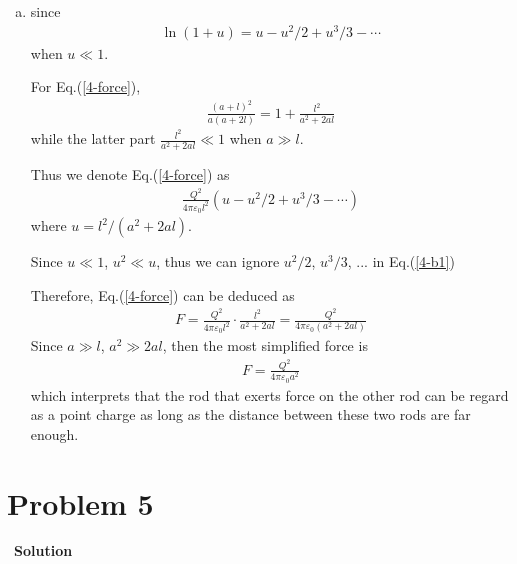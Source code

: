 \documentclass[12pt,a4paper]{article}
\begin{document}
\begin{enumerate}[(a)]
    \item since
    \begin{align}
        \ln (1+u) = u - u^2/2 + u^3/3 - \cdots
    \end{align}
    when $u \ll 1$.
    
    For Eq.(\ref{4-force}),
    \begin{align*}
        \frac{(a+l)^2}{a(a+2l)} = 1 + \frac{l^2}{a^2+2al}
    \end{align*}
    while the latter part $\frac{l^2}{a^2+2al} \ll 1$ when $a \gg l$.
    
    Thus we denote Eq.(\ref{4-force}) as
    \begin{align}
        \frac{Q^2}{4\pi\varepsilon_0 l^2} \left( u - u^2/2 + u^3/3 - \cdots \right)
        \label{4-b1}
    \end{align}
    where $u=l^2/(a^2+2al)$.
    
    Since $u \ll 1$, $u^2 \ll u$, thus we can ignore $u^2/2$, $u^3/3$, ... in Eq.(\ref{4-b1})
    
    Therefore, Eq.(\ref{4-force}) can be deduced as
    \begin{align}
        F = \frac{Q^2}{4\pi\varepsilon_0 l^2} \cdot \frac{l^2}{a^2+2al} = \frac{Q^2}{4\pi\varepsilon_0(a^2+2al)}
    \end{align}
    Since $a \gg l$, $a^2 \gg 2al$, then the most simplified force is
    \begin{align}
        F =  \frac{Q^2}{4\pi\varepsilon_0 a^2}
    \end{align}
    which interprets that the rod that exerts force on the other rod can be regard as a point charge as long as the distance between these two rods are far enough.
\end{enumerate}

\section*{\large \textbf{Problem 5}}~{\textbf{Solution}}
\end{document}
